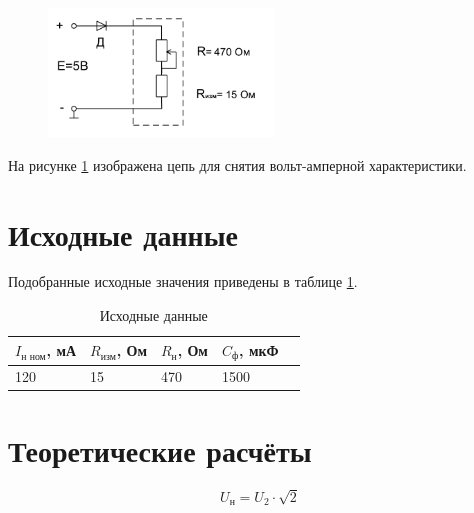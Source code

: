 \begin{figure}[H]
	\begin{center}
	\vspace{-0.5cm}
		\includegraphics[width=6cm]{img/vah}
		\caption{}
		\label{figure:2.2} %
	\vspace{-0.5cm}
	\end{center}
\end{figure}
На рисунке \ref{figure:2.2} изображена цепь для снятия вольт-амперной характеристики.

\section{Исходные данные}

Подобранные исходные значения приведены в таблице \ref{tabular:11}.

\begin{table}[H]
	\begin{center}
	\caption{Исходные данные}
	\def\arraystretch{1.5}
		\begin{tabularx}{\textwidth}{|X|X|X|X|X|}
			\hline
			$I_\text{н ном}$, мА & $R_\text{изм}$, Ом & $R_\text{н}$, Ом & $C_\text{ф}$, мкФ \\ \hline
		    120 & 15 & 470 & 1500\\\hline	
		\end{tabularx}
		\label{tabular:11}
	\end{center}
\end{table}



\section{Теоретические расчёты}

\begin{equation}
U_\text{н} = U_2 \cdot \sqrt{2}
\end{equation}


